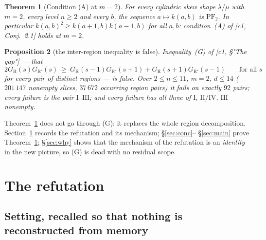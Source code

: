 \documentclass[11pt]{article}
\newtheorem{theorem}{Theorem}[section]
\newtheorem{proposition}[theorem]{Proposition}
\theoremstyle{definition}
\newcommand{\PFtwo}{\mathrm{PF}_2}
\begin{document}
\begin{theorem}[Condition (A) at $m=2$]\label{thm:main}
For every cylindric skew shape $\lambda/\mu$ with $m=2$, every level $n\ge2$ and every $b$,
the sequence $a\mapsto k(a,b)$ is $\PFtwo$. In particular
$k(a,b)^2\ge k(a+1,b)k(a-1,b)$ for all $a,b$: condition~(A) of
\textup{[c1, Conj.~2.1]} holds at $m=2$.
\end{theorem}

\begin{proposition}[the inter-region inequality is false]\label{prop:Gfalse}
Inequality~(G) of \textup{[c1, §"The gap"]} --- that
\[
 2G_{\mathrm R}(s)G_{\mathrm R'}(s)\ \ge\ G_{\mathrm R}(s-1)G_{\mathrm R'}(s+1)
   +G_{\mathrm R}(s+1)G_{\mathrm R'}(s-1)\qquad\text{for all }s \tag{G}
\]
for every pair of distinct regions --- is false. Over $2\le n\le 11$, $m=2$, $d\le14$
($201\,147$ nonempty slices, $37\,672$ occurring region pairs) it fails on exactly $92$
pairs; every failure is the pair $\mathrm I$--$\mathrm{III}$; and every failure has all
three of $\mathrm I$, $\mathrm{II}/\mathrm{IV}$, $\mathrm{III}$ nonempty.
\end{proposition}

Theorem~\ref{thm:main} does not go through (G): it replaces the whole region decomposition.
Section~\ref{sec:refute} records the refutation and its mechanism; §\ref{sec:conc}--%
§\ref{sec:main} prove Theorem~\ref{thm:main}; §\ref{sec:why} shows that the mechanism of
the refutation is an \emph{identity} in the new picture, so (G) is dead with no residual
scope.

\section{The refutation}\label{sec:refute}

\subsection{Setting, recalled so that nothing is reconstructed from memory}
\end{document}
